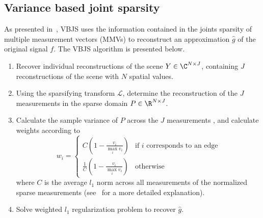 \documentclass{article}
\begin{document}

\subsection{Variance based joint sparsity}\label{subsec:vbjs}

As presented in~\cite{gelb_2018}, VBJS uses the information contained in the joints sparsity of multiple measurement vectors (MMVs) to reconstruct an approximation $\hat{g}$ of the original signal $f$. The VBJS algorithm is presented below.

\begin{enumerate}
    \item Recover individual reconstructions of the scene $Y \in \C^{N\times J}$, containing $J$ reconstructions of the scene with $N$ spatial values.
    \item Using the sparsifying transform $\mathcal{L}$, determine the reconstruction of the $J$ measurements in the sparse domain $P \in \R^{N\times J}$. %
    \item Calculate the sample variance of $P$ across the $J$ measurements%
    , and calculate weights according to
    \begin{equation}
        w_i = \begin{cases}
            C(1-\frac{v_i}{\max_i v_i}) & \text{if $i$ corresponds to an edge} \\
            \frac{1}{C}(1-\frac{v_i}{\max_i v_i}) & \text{otherwise}
    \end{cases}
    \end{equation}
    where $C$ is the average $l_1$ norm across all measurements of the normalized sparse measurements (see~\cite{gelb_2018} for a more detailed explanation).
    \item Solve weighted $l_1$ regularization problem to recover $\hat{g}$.
\end{enumerate}
\end{document}
